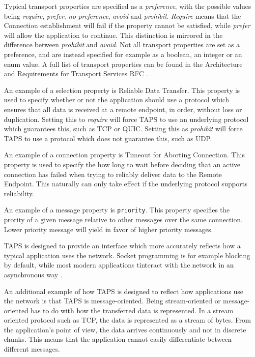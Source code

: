 Typical transport properties are specified as
a \textit{preference}, with the possible values being \textit{require},
\textit{prefer}, \textit{no preference}, \textit{avoid} and \textit{prohibit}.
\textit{Require} means that the Connection establishment will fail if the property cannot
be satisfied, while \textit{prefer} will allow the application to continue.
This distinction is mirrored in the difference between \textit{prohibit} and \textit{avoid}.
Not all transport properties are set as a preference, and are
instead specified for example as a boolean, an integer or an enum value.
A full list of transport properties can be found in the Architecture and Requirements for
Transport Services RFC
\cite{paulyArchitectureRequirementsTransport2025}.

An example of a selection property is Reliable Data Transfer.
This property is used to specify whether or not the application
should use a protocol which ensures that all data is received at 
a remote endpoint, in order, without loss or duplication. Setting
this to \textit{require} will force TAPS to use an underlying protocol
which guarantees this, such as TCP or QUIC. Setting this as
\textit{prohibit} will force TAPS to use a protocol which does not
guarantee this, such as UDP.


An example of a connection property is Timeout for Aborting Connection.
This property is used to specify the how long to wait before deciding that an
active connection has failed when trying to reliably deliver data to the Remote Endpoint.
This naturally can only take effect if the underlying protocol supports reliability.

An example of a message property is \texttt{priority}. This property specifies
the prority of a given message relative to other messages over the same connection.
Lower priority message will yield in favor of higher priority messages.

TAPS is designed to provide an interface which more accurately
reflects how a typical application uses the network. Socket programming
is for example blocking by default, while most modern applications
tinteract with the network in an asynchronous way 
\cite{trammellAbstractApplicationProgramming2025}.

An additional
example of how TAPS is designed to reflect how applications
use the network is that TAPS is message-oriented. 
Being stream-oriented or message-oriented has to do with how the
transferred data is represented. In a stream oriented protocol
such as TCP, the data is represented as a stream of bytes. From
the application's point of view, the data arrives continuously
and not in discrete chunks. This means that the application
cannot easily differentiate between different messages. 

